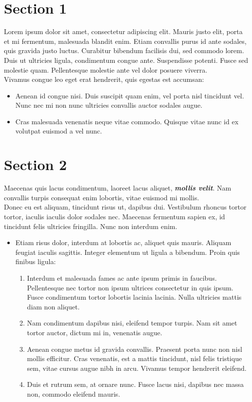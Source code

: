 \documentclass{article} %
\begin{document}
\section{Section 1}

Lorem ipsum dolor sit amet, consectetur adipiscing elit. Mauris justo elit, porta et mi fermentum, malesuada blandit enim. Etiam convallis purus id ante sodales, quis gravida justo luctus. Curabitur bibendum facilisis dui, sed commodo lorem. Duis ut ultricies ligula, condimentum congue ante. Suspendisse potenti. Fusce sed molestie quam. Pellentesque molestie ante vel dolor posuere viverra.
\\

Vivamus congue leo eget erat hendrerit, quis egestas est accumsan:
\begin{itemize}
	\item{Aenean id congue nisi. Duis suscipit quam enim, vel porta nisl tincidunt vel. Nunc nec mi non nunc ultricies convallis auctor sodales augue.}
	\item{Cras malesuada venenatis neque vitae commodo. Quisque vitae nunc id ex volutpat euismod a vel nunc.}
\end{itemize}

\section{Section 2}
Maecenas quis lacus condimentum, laoreet lacus aliquet, \textbf{\textit{mollis velit}}. Nam convallis turpis consequat enim lobortis, vitae euismod mi mollis.
\\

Donec eu est aliquam, tincidunt risus ut, dapibus dui. Vestibulum rhoncus tortor tortor, iaculis iaculis dolor sodales nec. Maecenas fermentum sapien ex, id tincidunt felis ultricies fringilla. Nunc non interdum enim. 

\begin{itemize}
	\item Etiam risus dolor, interdum at lobortis ac, aliquet quis mauris. Aliquam feugiat iaculis sagittis. Integer elementum ut ligula a bibendum. Proin quis finibus ligula:

	\begin{enumerate}
		\item Interdum et malesuada fames ac ante ipsum primis in faucibus. Pellentesque nec tortor non ipsum ultrices consectetur in quis ipsum. Fusce condimentum tortor lobortis lacinia lacinia. Nulla ultricies mattis diam non aliquet.
		\item Nam condimentum dapibus nisi, eleifend tempor turpis. Nam sit amet tortor auctor, dictum mi in, venenatis augue.
		\item Aenean congue metus id gravida convallis. Praesent porta nunc non nisl mollis efficitur. Cras venenatis, est a mattis tincidunt, nisl felis tristique sem, vitae cursus augue nibh in arcu. Vivamus tempor hendrerit eleifend.
		\item Duis et rutrum sem, at ornare nunc. Fusce lacus nisi, dapibus nec massa non, commodo eleifend mauris.
	\end{enumerate}
\end{itemize}
\end{document}
